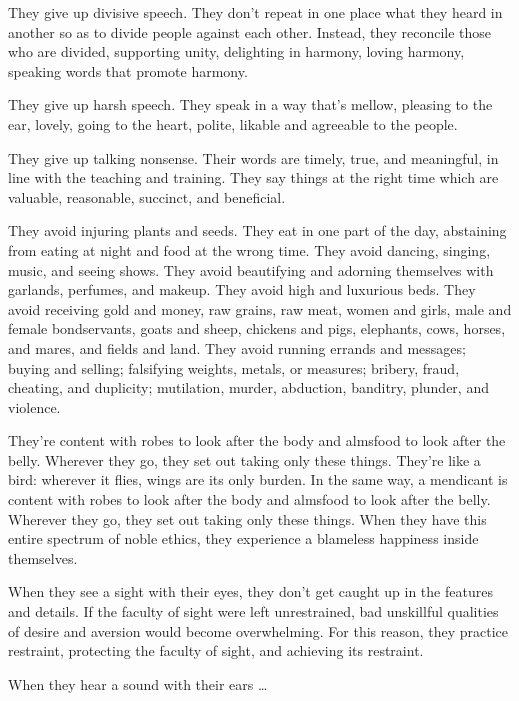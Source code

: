 \documentclass[12pt,openany]{book}%
\begin{document}
They give up divisive speech. They don’t repeat in one place what they heard in another so as to divide people against each other. Instead, they reconcile those who are divided, supporting unity, delighting in harmony, loving harmony, speaking words that promote harmony. 

They give up harsh speech. They speak in a way that’s mellow, pleasing to the ear, lovely, going to the heart, polite, likable and agreeable to the people. 

They give up talking nonsense. Their words are timely, true, and meaningful, in line with the teaching and training. They say things at the right time which are valuable, reasonable, succinct, and beneficial. 

They avoid injuring plants and seeds. They eat in one part of the day, abstaining from eating at night and food at the wrong time. They avoid dancing, singing, music, and seeing shows. They avoid beautifying and adorning themselves with garlands, perfumes, and makeup. They avoid high and luxurious beds. They avoid receiving gold and money, raw grains, raw meat, women and girls, male and female bondservants, goats and sheep, chickens and pigs, elephants, cows, horses, and mares, and fields and land. They avoid running errands and messages; buying and selling; falsifying weights, metals, or measures; bribery, fraud, cheating, and duplicity; mutilation, murder, abduction, banditry, plunder, and violence. 

They’re content with robes to look after the body and almsfood to look after the belly. Wherever they go, they set out taking only these things. They’re like a bird: wherever it flies, wings are its only burden. In the same way, a mendicant is content with robes to look after the body and almsfood to look after the belly. Wherever they go, they set out taking only these things. When they have this entire spectrum of noble ethics, they experience a blameless happiness inside themselves. 

When they see a sight with their eyes, they don’t get caught up in the features and details. If the faculty of sight were left unrestrained, bad unskillful qualities of desire and aversion would become overwhelming. For this reason, they practice restraint, protecting the faculty of sight, and achieving its restraint. 

When they hear a sound with their ears … 
\end{document}
